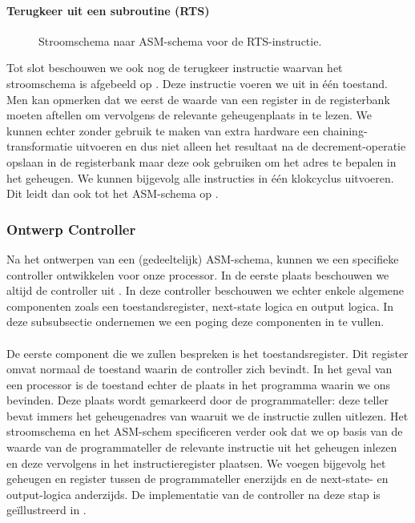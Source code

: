 \paragraph{Terugkeer uit een subroutine (RTS)}
\begin{figure}[hbt]
\centering
{}
\caption{Stroomschema naar ASM-schema voor de RTS-instructie.}
\label{flowasm-rts}
\end{figure}
Tot slot beschouwen we ook nog de terugkeer instructie waarvan het stroomschema is afgebeeld op . Deze instructie voeren we uit in \'e\'en toestand. Men kan opmerken dat we eerst de waarde van een register in de registerbank moeten aftellen om vervolgens de relevante geheugenplaats in te lezen. We kunnen echter zonder gebruik te maken van extra hardware een chaining-transformatie uitvoeren en dus niet alleen het resultaat na de decrement-operatie opslaan in de registerbank maar deze ook gebruiken om het adres te bepalen in het geheugen. We kunnen bijgevolg alle instructies in \'e\'en klokcyclus uitvoeren. Dit leidt dan ook tot het ASM-schema op .
\subsubsection{Ontwerp Controller}
Na het ontwerpen van een (gedeeltelijk) ASM-schema, kunnen we een specifieke controller ontwikkelen voor onze processor. In de eerste plaats beschouwen we altijd de controller uit . In deze controller beschouwen we echter enkele algemene componenten zoals een toestandsregister, next-state logica en output logica. In deze subsubsectie ondernemen we een poging deze componenten in te vullen.
\paragraph{}
De eerste component die we zullen bespreken is het toestandsregister. Dit register omvat normaal de toestand waarin de controller zich bevindt. In het geval van een processor is de toestand echter de plaats in het programma waarin we ons bevinden. Deze plaats wordt gemarkeerd door de programmateller: deze teller bevat immers het geheugenadres van waaruit we de instructie zullen uitlezen. Het stroomschema en het ASM-schem specificeren verder ook dat we op basis van de waarde van de programmateller de relevante instructie uit het geheugen inlezen en deze vervolgens in het instructieregister plaatsen. We voegen bijgevolg het geheugen en register tussen de programmateller enerzijds en de next-state- en output-logica anderzijds. De implementatie van de controller na deze stap is ge\"illustreerd in .
